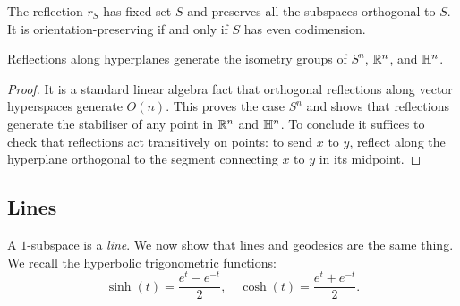 \begin{ex}
The reflection $r_S$ has fixed set $S$ and preserves all the subspaces orthogonal to $S$. It is orientation-preserving if and only if $S$ has even codimension.
\end{ex}

\begin{prop} \label{reflections:generate:prop}
Reflections along hyperplanes generate the isometry groups of $S^n$, $\mathbb{R}^n$, and $\mathbb{H}^n$.
\end{prop}
\begin{proof}
It is a standard linear algebra fact that orthogonal reflections along vector hyperspaces
generate $O(n)$. This proves the case $S^n$ and shows that reflections generate the stabiliser of any point in $\mathbb{R}^n$ and $\mathbb{H}^n$. To conclude it suffices to check that reflections act transitively on points: to send $x$ to $y$, reflect along the hyperplane orthogonal to the segment connecting $x$ to $y$ in its midpoint.
\end{proof}

\subsection{Lines}
A $1$-subspace is a \emph{line}. We now show that lines and geodesics are the same thing. We recall the hyperbolic trigonometric functions: 
$$\sinh (t) = \frac{e^t-e^{-t}}2, \quad \cosh (t) = \frac{e^t+e^{-t}}2.$$

